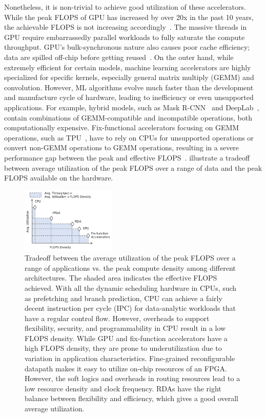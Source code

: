 Nonetheless, it is non-trivial to achieve good utilization of these accelerators.
While the peak FLOPS of GPU has increased by over 20x in the past 10 years, the achievable FLOPS is
not increasing accordingly~\cite{floptrend, gpuperfana}.
The massive threads in GPU require embarrassedly parallel workloads to fully saturate the compute
throughput. GPU's bulk-synchronous nature also causes poor cache efficiency; data are spilled
off-chip before getting reused~\cite{gpuinefficiency}.
On the outer hand, 
while extremely efficient for certain models, machine learning accelerators are highly
specialized for specific kernels, especially general matrix multiply (GEMM) and convolution.
However, ML algorithms evolve much faster than the development and manufacture cycle of hardware, 
leading to inefficiency or even unsupported applications.
For example, hybrid models, such as Mask R-CNN~\cite{maskrcnn} and DeepLab~\cite{deeplab}, contain
combinations of GEMM-compatible and incompatible operations, both computationally expensive.
Fix-functional accelerators focusing on GEMM operations, such as TPU~\cite{tpu}, 
have to rely on CPUs for unsupported operations or
convert non-GEMM operations to GEMM operations, resulting in a severe performance gap between the
peak and effective FLOPS~\cite{effflexdnnaccel}.
 illustrate a tradeoff between average utilization of the peak FLOPS over a range
of data and the peak FLOPS available on the hardware.

\begin{figure}
\centering
\includegraphics[width=0.4\textwidth]{figs/peakutil.pdf}
\caption[Average utilization vs. peak compute density tradeoff]{
 Tradeoff between the average utilization of the peak FLOPS over a range of applications vs. the peak compute density 
 among different architectures.
 The shaded area indicates the effective FLOPS achieved.
 With all the dynamic scheduling hardware in CPUs, such as prefetching and branch prediction, 
 CPU can achieve a fairly decent instruction per cycle (IPC) for data-analytic workloads that have a 
 regular control flow. 
 However, overheads to support flexibility, security, and programmability in CPU result in a low FLOPS
 density. 
 While GPU and fix-function accelerators have a high FLOPS density, they are prone to
 underutilization due to variation in application characteristics. 
 Fine-grained reconfigurable datapath makes it easy to utilize on-chip resources of an FPGA.
 However, the soft logics and overheads in routing resources lead to a low resource density and clock frequency.
 RDAs have the right balance between flexibility and efficiency, which gives a good overall average utilization.
}
\label{fig:peakutil}
\end{figure}

